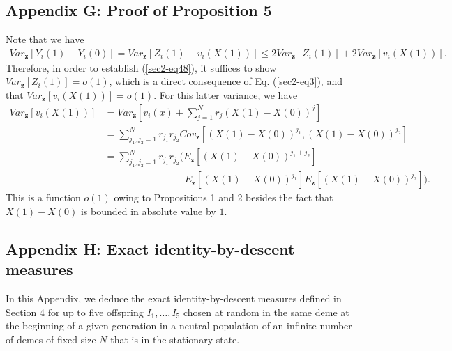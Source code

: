 \documentclass[11pt]{article}
\begin{document}
\subsection*{Appendix G: Proof of Proposition 5 }
Note that we have
\begin{equation}\label{sec2-eq49}
\begin{split}
Var_{\mathbf{z}}\left[Y_i(1)-Y_i(0)\right]=Var_{\mathbf{z}}\left[Z_i(1)-v_i(X(1))\right]\leq 
2Var_{\mathbf{z}}\left[Z_i(1)\right]+2Var_{\mathbf{z}}\left[v_i(X(1))\right].
\end{split}
\end{equation}
Therefore, in order to establish (\ref{sec2-eq48}), it suffices to show  $Var_{\mathbf{z}}\left[Z_i(1)\right]=o(1)$, which is a direct consequence of Eq. (\ref{sec2-eq3}), and that $Var_{\mathbf{z}}\left[v_i(X(1))\right]=o(1)$. For this latter variance, we have
\begin{align}\label{sec2-eq50}
Var_{\mathbf{z}}\left[v_i(X(1))\right]&=Var_{\mathbf{z}}\left[v_i(x)+\sum_{j=1}^{N}r_j\left(X(1)-X(0)\right)^j\right]\nonumber\\
&=\sum_{j_1,j_2=1}^{N}r_{j_1}r_{j_2}Cov_{\mathbf{z}}\left[\left(X(1)-X(0)\right)^{j_1},\left(X(1)-X(0)\right)^{j_2}\right]\nonumber\\
&=\sum_{j_1,j_2=1}^{N}r_{j_1}r_{j_2}\Bigg(
E_{\mathbf{z}}\left[\left(X(1)-X(0)\right)^{j_1+j_2}\right]\nonumber\\
&\quad\quad\quad\quad\quad\quad\quad-E_{\mathbf{z}}\left[\left(X(1)-X(0)\right)^{j_1}\right]E_{\mathbf{z}}\left[\left(X(1)-X(0)\right)^{j_2}\right]
\Bigg).
\end{align}
This is a function $o(1)$ owing to Propositions 1 and 2 besides the fact that $X(1)-X(0)$ is bounded in absolute value by $1$.

\subsection*{Appendix H: Exact identity-by-descent measures}

In this Appendix, we deduce the exact identity-by-descent measures defined in Section 4 for up to five offspring $I_1, \ldots, I_5$ chosen at random in the same deme at the beginning of a given generation in a neutral population of an infinite number of demes of fixed size $N$ that is in the stationary state.
\end{document}
